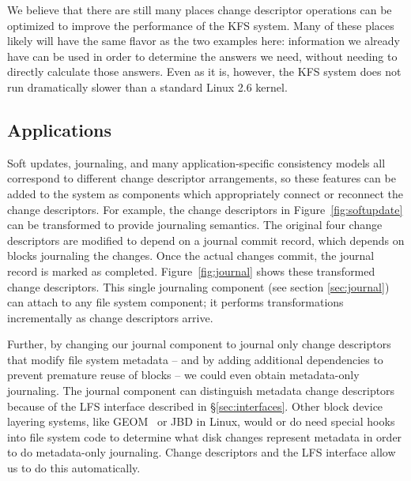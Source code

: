 We believe that there are still many places change descriptor operations can be
optimized to improve the performance of the KFS system. Many of these places
likely will have the same flavor as the two examples here: information we
already have can be used in order to determine the answers we need, without
needing to directly calculate those answers. Even as it is, however, the KFS
system does not run dramatically slower than a standard Linux 2.6 kernel.

\subsection {Applications}
Soft updates, journaling, and many application-specific consistency models all
correspond to different change descriptor arrangements, so these features can be
added to the system as components which appropriately connect or reconnect the
change descriptors. For example, the change descriptors in
Figure~\ref{fig:softupdate} can be transformed to provide journaling semantics.
The original four change descriptors are modified to depend on a journal commit
record, which depends on blocks journaling the changes. Once the actual changes
commit, the journal record is marked as completed. Figure~\ref{fig:journal}
shows these transformed change descriptors. This single journaling component
(see section \ref{sec:journal}) can attach to any file system component; it
performs transformations incrementally as change descriptors arrive.

Further, by changing our journal component to journal only change descriptors
that modify file system metadata -- and by adding additional dependencies to
prevent premature reuse of blocks -- we could even obtain metadata-only
journaling. The journal component can distinguish metadata change descriptors
because of the LFS interface described in \S\ref{sec:interfaces}. Other block
device layering systems, like GEOM~\cite{geom} or JBD in Linux, would or do need
special hooks into file system code to determine what disk changes represent
metadata in order to do metadata-only journaling. Change descriptors and the LFS
interface allow us to do this automatically.
